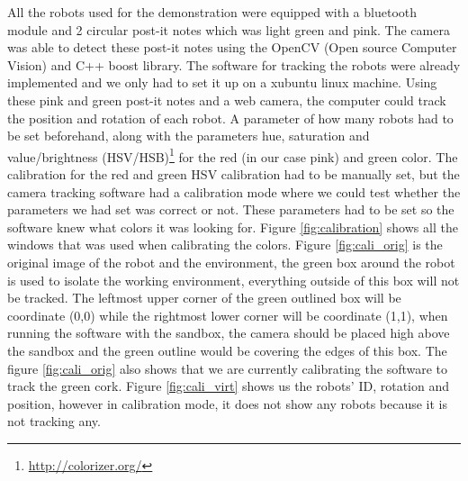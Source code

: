 All the robots used for the demonstration were equipped with a bluetooth module and 2 circular post-it notes which was light green and pink.
The camera was able to detect these post-it notes using the OpenCV (Open source Computer Vision) and C++ boost library. The software for tracking the robots were already implemented and we only had to set it up on a xubuntu linux machine.
Using these pink and green post-it notes and a web camera, the computer could track the position and rotation of each robot. A parameter of how many robots had to be set beforehand, along with the parameters hue, saturation and value/brightness (HSV/HSB)\footnote{\href{http://colorizer.org/}{http://colorizer.org/}} for the red (in our case pink) and green color. The calibration for the red and green HSV calibration had to be manually set, but the camera tracking software had a calibration mode where we could test whether the parameters we had set was correct or not. These parameters had to be set so the software knew what colors it was looking for.
Figure \ref{fig:calibration} shows all the windows that was used when calibrating the colors. Figure \ref{fig:cali_orig} is the original image of the robot and the environment, the green box around the robot is used to isolate the working environment, everything outside of this box will not be tracked. The leftmost upper corner of the green outlined box will be coordinate (0,0) while the rightmost lower corner will be coordinate (1,1), when running the software with the sandbox, the camera should be placed high above the sandbox and the green outline would be covering the edges of this box. The figure \ref{fig:cali_orig} also shows that we are currently calibrating the software to track the green cork. Figure \ref{fig:cali_virt} shows us the robots' ID, rotation and position, however in calibration mode, it does not show any robots because it is not tracking any.

